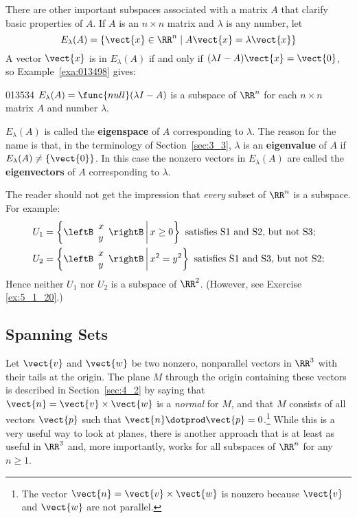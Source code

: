 There are other important subspaces associated with a matrix $A$ that clarify basic properties of $A$. If $A$ is an $n \times n$ matrix and $\lambda$ is any number, let
\begin{equation*}
E_\lambda(A) = \{\vect{x} \in \RR^n \mid A\vect{x} = \lambda\vect{x} \}
\end{equation*}
A vector $\vect{x}$ is in $E_\lambda(A)$ if and only if $(\lambda I - A)\vect{x} = \vect{0}$, so Example~\ref{exa:013498} gives:

\begin{example}{}{013534}
$E_\lambda(A) = \func{null}(\lambda I- A)$ is a subspace of $\RR^n$ for each $n \times n$ matrix $A$ and number $\lambda$.
\end{example}

\noindent $E_\lambda(A)$ is called the \textbf{eigenspace} of $A$ corresponding to $\lambda$. The reason for the name is that, in the terminology of Section~\ref{sec:3_3}, $\lambda$ is an \textbf{eigenvalue} of $A$ if $E_\lambda(A) \neq \{\vect{0}\}$. In this case the nonzero vectors in  $E_\lambda(A)$ are called the \textbf{eigenvectors} of $A$ corresponding to $\lambda$.

The reader should not get the impression that \textit{every} subset of $\RR^n$ is a subspace. For example:
\begin{align*}
U_1 &= \left \{
\leftB \begin{array}{l}
x \\
y
\end{array} \rightB \,
\middle| \, x \geq 0 \right\} 
\mbox{ satisfies S1 and S2, but not S3;} \\
U_2 &= \left \{
\leftB \begin{array}{l}
x \\
y
\end{array} \rightB  \,
\middle| \, x^2 = y^2 \right\} 
\mbox{ satisfies S1 and S3, but not S2;}
\end{align*}
Hence neither $U_{1}$ nor $U_{2}$ is a subspace of $\RR^2$. (However, see Exercise \ref{ex:5_1_20}.)

\subsection*{Spanning Sets}

Let $\vect{v}$ and $\vect{w}$ be two nonzero, nonparallel vectors in $\RR^3$ with their tails at the origin. The plane $M$ through the origin containing these vectors is described in Section~\ref{sec:4_2} by saying that $\vect{n} = \vect{v} \times \vect{w}$ is a \textit{normal} for $M$, and that $M$ consists of all vectors $\vect{p}$ such that $\vect{n} \dotprod \vect{p} = 0$.\footnote{The vector $\vect{n} = \vect{v} \times \vect{w}$ is nonzero because $\vect{v}$ and $\vect{w}$ are not parallel.}
 While this is a very useful way to look at planes, there is another approach that is at least as useful in $\RR^3$ and, more importantly, works for all subspaces of $\RR^n$ for any $n \geq 1$.

